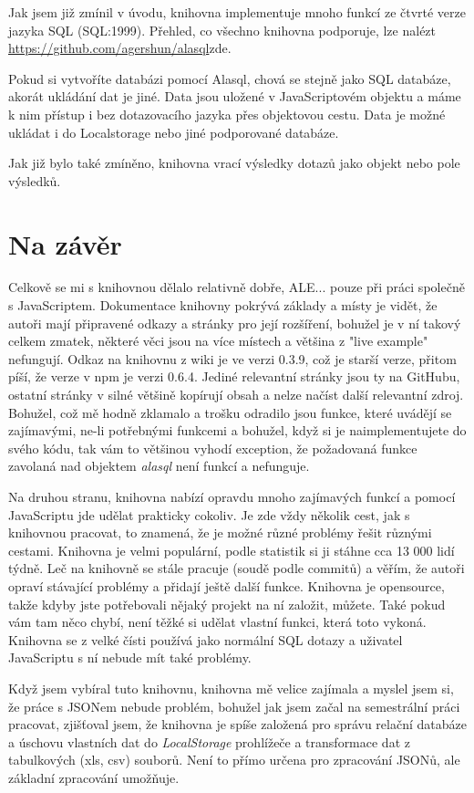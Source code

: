 \documentclass[a4, titlepage]{article}
\begin{document}
Jak jsem již zmínil v úvodu, knihovna implementuje mnoho funkcí ze čtvrté verze jazyka SQL (SQL:1999). Přehled, co všechno knihovna podporuje, lze nalézt \url{https://github.com/agershun/alasql}{zde}.  

Pokud si vytvoříte databázi pomocí Alasql, chová se stejně jako SQL databáze, akorát ukládání dat je jiné. Data jsou uložené v JavaScriptovém objektu a máme k nim přístup i bez dotazovacího jazyka přes objektovou cestu. Data je možné ukládat i do Localstorage nebo jiné podporované databáze.

Jak již bylo také zmíněno, knihovna vrací výsledky dotazů jako objekt nebo pole výsledků.

\section{Na závěr}
Celkově se mi s knihovnou dělalo relativně dobře, ALE... pouze při práci společně s JavaScriptem. Dokumentace knihovny pokrývá základy a místy je vidět, že autoři mají připravené odkazy a stránky pro její rozšíření, bohužel je v ní takový celkem zmatek, některé věci jsou na více místech a většina z "live example" nefungují. Odkaz na knihovnu z wiki je ve verzi 0.3.9, což je starší verze, přitom píší, že verze v npm je verzi 0.6.4. Jediné relevantní stránky jsou ty na GitHubu, ostatní stránky v silné většině kopírují obsah a nelze načíst další relevantní zdroj. Bohužel, což mě hodně zklamalo a trošku odradilo jsou funkce, které uvádějí se zajímavými, ne-li potřebnými funkcemi a bohužel, když si je naimplementujete do svého kódu, tak vám to většinou vyhodí exception, že požadovaná funkce zavolaná nad objektem \textit{alasql} není funkcí a nefunguje. 

Na druhou stranu, knihovna nabízí opravdu mnoho zajímavých funkcí a pomocí JavaScriptu jde udělat prakticky cokoliv. Je zde vždy několik cest, jak s knihovnou pracovat, to znamená, že je možné různé problémy řešit různými cestami. Knihovna je velmi populární, podle statistik si ji stáhne cca 13 000 lidí týdně. Leč na knihovně se stále pracuje (soudě podle commitů) a věřím, že autoři opraví stávající problémy a přidají ještě další funkce. Knihovna je opensource, takže kdyby jste potřebovali nějaký projekt na ní založit, můžete. Také pokud vám tam něco chybí, není těžké si udělat vlastní funkci, která toto vykoná. Knihovna se z velké čísti používá jako normální SQL dotazy a uživatel JavaScriptu s ní nebude mít také problémy.

Když jsem vybíral tuto knihovnu, knihovna mě velice zajímala a myslel jsem si, že práce s JSONem nebude problém, bohužel jak jsem začal na semestrální práci pracovat, zjišťoval jsem, že knihovna je spíše založená pro správu relační databáze a úschovu vlastních dat do \textit{LocalStorage} prohlížeče a transformace dat z tabulkových (xls, csv) souborů. Není to přímo určena pro zpracování JSONů, ale základní zpracování umožňuje.
\end{document}
